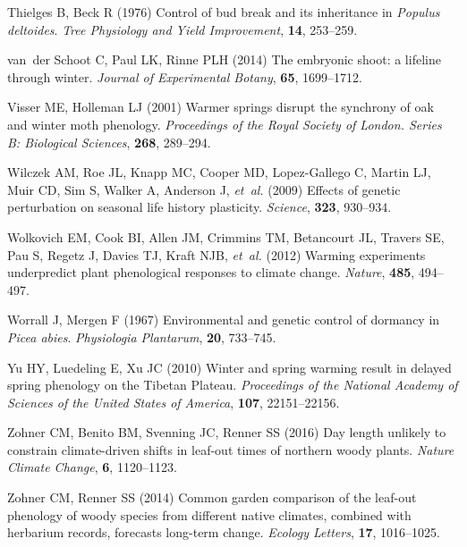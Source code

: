 \documentclass[11pt,letter]{article}
\begin{document}
\begin{thebibliography}{63}
Thielges B, Beck R (1976) {Control of bud break and its inheritance in
  \emph{Populus deltoides}}.
\newblock \emph{Tree Physiology and Yield Improvement}, \textbf{14}, 253--259.

van~der Schoot C, Paul LK, Rinne PLH (2014) The embryonic shoot: a lifeline
  through winter.
\newblock \emph{Journal of Experimental Botany}, \textbf{65}, 1699--1712.

Visser ME, Holleman LJ (2001) Warmer springs disrupt the synchrony of oak and
  winter moth phenology.
\newblock \emph{Proceedings of the Royal Society of London. Series B:
  Biological Sciences}, \textbf{268}, 289--294.

Wilczek AM, Roe JL, Knapp MC, Cooper MD, Lopez-Gallego C, Martin LJ, Muir CD,
  Sim S, Walker A, Anderson J, \emph{et~al.} (2009) Effects of genetic
  perturbation on seasonal life history plasticity.
\newblock \emph{Science}, \textbf{323}, 930--934.

Wolkovich EM, Cook BI, Allen JM, Crimmins TM, Betancourt JL, Travers SE, Pau S,
  Regetz J, Davies TJ, Kraft NJB, \emph{et~al.} (2012) Warming experiments
  underpredict plant phenological responses to climate change.
\newblock \emph{Nature}, \textbf{485}, 494--497.

Worrall J, Mergen F (1967) {Environmental and genetic control of dormancy in
  \emph{Picea abies}}.
\newblock \emph{Physiologia Plantarum}, \textbf{20}, 733--745.

Yu HY, Luedeling E, Xu JC (2010) {Winter and spring warming result in delayed
  spring phenology on the Tibetan Plateau}.
\newblock \emph{Proceedings of the National Academy of Sciences of the United
  States of America}, \textbf{107}, 22151--22156.

Zohner CM, Benito BM, Svenning JC, Renner SS (2016) Day length unlikely to
  constrain climate-driven shifts in leaf-out times of northern woody plants.
\newblock \emph{Nature Climate Change}, \textbf{6}, 1120--1123.

Zohner CM, Renner SS (2014) Common garden comparison of the leaf-out phenology
  of woody species from different native climates, combined with herbarium
  records, forecasts long-term change.
\newblock \emph{Ecology Letters}, \textbf{17}, 1016--1025.

\end{thebibliography}
\end{document}
